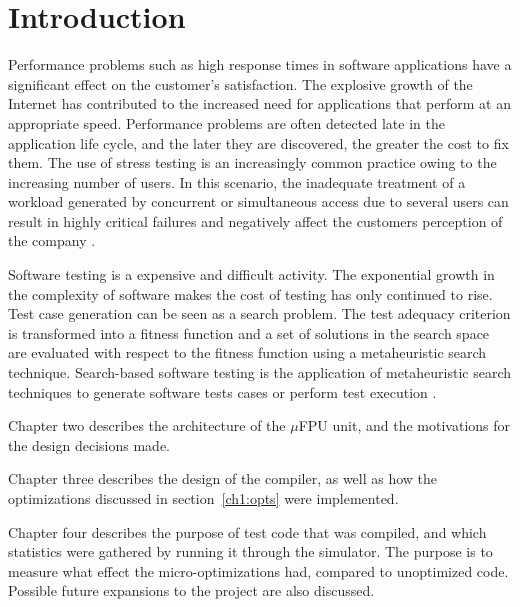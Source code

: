 \chapter{Introduction}

Performance problems such as high response times in software applications have a significant effect on the customer's satisfaction. The explosive growth of the Internet has contributed to the increased need for applications that perform at an appropriate speed. Performance problems are often detected late in the application life cycle, and the later they are discovered, the greater the cost to fix them. The use of stress testing is an increasingly common practice owing to the increasing number of users. In this scenario, the inadequate treatment of a workload generated by concurrent or simultaneous access due to several users can result in highly critical failures and negatively affect the customers perception of the company \cite{Draheim2006b} \cite{Jiang2010} \cite{Molyneaux2009} \cite{Wert2014}. 

Software testing is a expensive and difficult activity. The exponential
growth in the complexity of software makes the cost of testing has only continued to rise. Test case generation can be seen as a search problem. The test adequacy criterion is transformed into a fitness function and a set of solutions in the search
space are evaluated with respect to the fitness function using a metaheuristic search technique. Search-based software testing is the application of metaheuristic search techniques to generate software
tests cases or perform test execution \cite{Afzal2009a} \cite{Gay}.

Chapter two describes the architecture of the $\mu$FPU unit, and the
motivations for the design decisions made.

Chapter three describes the design of the compiler, as well as how the
optimizations discussed in section~\ref{ch1:opts} were implemented.

Chapter four describes the purpose of test code that was compiled, and which
statistics were gathered by running it through the simulator.  The purpose
is to measure what effect the micro-optimizations had, compared to
unoptimized code.  Possible future expansions to the project are also
discussed.

